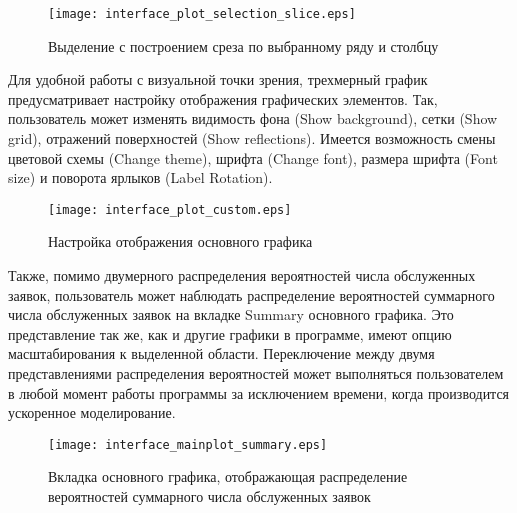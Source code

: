 \begin{figure}[H]
	\centering
	\texttt{[image: interface\_plot\_selection\_slice.eps]}
	\caption{Выделение с построением среза по выбранному ряду и столбцу}
	\label{interface_plot_selection_slice}
\end{figure}
Для удобной работы с визуальной точки зрения, трехмерный график предусматривает настройку отображения графических элементов. Так, пользователь может изменять видимость фона (Show background), сетки (Show grid), отражений поверхностей (Show reflections). Имеется возможность смены  цветовой схемы (Change theme), шрифта (Change font), размера шрифта (Font size) и поворота ярлыков (Label Rotation). 

\begin{figure}[H]
	\centering
	\texttt{[image: interface\_plot\_custom.eps]}
	\caption{Настройка отображения основного графика}
	\label{interface_plot_custom}
\end{figure}

Также, помимо двумерного распределения вероятностей числа обслуженных заявок, пользователь может наблюдать распределение вероятностей суммарного числа обслуженных заявок на вкладке Summary основного графика. Это представление так же, как и другие графики в программе, имеют опцию масштабирования к выделенной области. Переключение между двумя представлениями распределения вероятностей может выполняться пользователем в любой момент работы программы за исключением времени, когда производится ускоренное моделирование. 
\begin{figure}[H]
	\centering
	\texttt{[image: interface\_mainplot\_summary.eps]}
	\caption{Вкладка основного графика, отображающая распределение вероятностей суммарного числа обслуженных заявок}
	\label{interface_mainplot_summary}
\end{figure}
